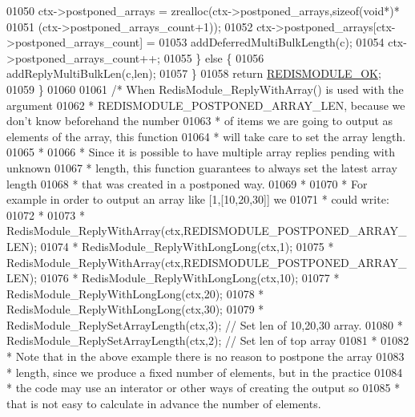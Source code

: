 \begin{DoxyCode}
{{01050         ctx->postponed\_arrays = zrealloc(ctx->postponed\_arrays,\textcolor{keyword}{sizeof}(\textcolor{keywordtype}{void}*)*
01051                 (ctx->postponed\_arrays\_count+1));
01052         ctx->postponed\_arrays[ctx->postponed\_arrays\_count] =
01053             addDeferredMultiBulkLength(c);
01054         ctx->postponed\_arrays\_count++;
01055     \} \textcolor{keywordflow}{else} \{
01056         addReplyMultiBulkLen(c,len);
01057     \}
01058     \textcolor{keywordflow}{return} \hyperlink{redismodule_8h_a1bc5bfd69abcd378ff52c640adc5418d}{REDISMODULE\_OK};
01059 \}
01060 
01061 \textcolor{comment}{/* When RedisModule\_ReplyWithArray() is used with the argument}
01062 \textcolor{comment}{ * REDISMODULE\_POSTPONED\_ARRAY\_LEN, because we don't know beforehand the number}
01063 \textcolor{comment}{ * of items we are going to output as elements of the array, this function}
01064 \textcolor{comment}{ * will take care to set the array length.}
01065 \textcolor{comment}{ *}
01066 \textcolor{comment}{ * Since it is possible to have multiple array replies pending with unknown}
01067 \textcolor{comment}{ * length, this function guarantees to always set the latest array length}
01068 \textcolor{comment}{ * that was created in a postponed way.}
01069 \textcolor{comment}{ *}
01070 \textcolor{comment}{ * For example in order to output an array like [1,[10,20,30]] we}
01071 \textcolor{comment}{ * could write:}
01072 \textcolor{comment}{ *}
01073 \textcolor{comment}{ *      RedisModule\_ReplyWithArray(ctx,REDISMODULE\_POSTPONED\_ARRAY\_LEN);}
01074 \textcolor{comment}{ *      RedisModule\_ReplyWithLongLong(ctx,1);}
01075 \textcolor{comment}{ *      RedisModule\_ReplyWithArray(ctx,REDISMODULE\_POSTPONED\_ARRAY\_LEN);}
01076 \textcolor{comment}{ *      RedisModule\_ReplyWithLongLong(ctx,10);}
01077 \textcolor{comment}{ *      RedisModule\_ReplyWithLongLong(ctx,20);}
01078 \textcolor{comment}{ *      RedisModule\_ReplyWithLongLong(ctx,30);}
01079 \textcolor{comment}{ *      RedisModule\_ReplySetArrayLength(ctx,3); // Set len of 10,20,30 array.}
01080 \textcolor{comment}{ *      RedisModule\_ReplySetArrayLength(ctx,2); // Set len of top array}
01081 \textcolor{comment}{ *}
01082 \textcolor{comment}{ * Note that in the above example there is no reason to postpone the array}
01083 \textcolor{comment}{ * length, since we produce a fixed number of elements, but in the practice}
01084 \textcolor{comment}{ * the code may use an interator or other ways of creating the output so}
01085 \textcolor{comment}{ * that is not easy to calculate in advance the number of elements.}
}}
\end{DoxyCode}
